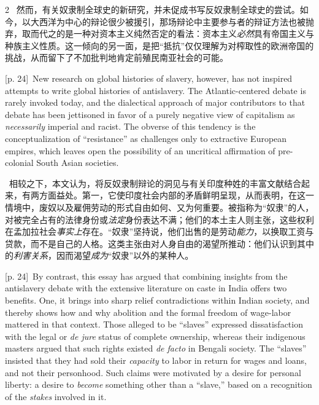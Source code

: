 \documentclass[10pt,a4paper]{article}
\begin{document}
\begin{paracol}{2}
\switchcolumn*
{\scriptsize\color{gray} [p. 24]}\ 然而，有关奴隶制全球史的新研究，并未促成书写反奴隶制全球史的尝试。如今，以大西洋为中心的辩论很少被援引，那场辩论中主要参与者的辩证方法也被抛弃，取而代之的是一种对资本主义纯然否定的看法：资本主义\textit{必然}具有帝国主义与种族主义性质。这一倾向的另一面，是把“抵抗”仅仅理解为对榨取性的欧洲帝国的挑战，从而留下了不加批判地肯定前殖民南亚社会的可能。\par
\switchcolumn
{\scriptsize\color{gray} [p. 24]}\ New research on global histories of slavery, however, has not inspired attempts to write global histories of antislavery. The Atlantic-centered debate is rarely invoked today, and the dialectical approach of major contributors to that debate has been jettisoned in favor of a purely negative view of capitalism as \textit{necessarily} imperial and racist. The obverse of this tendency is the conceptualization of “resistance” as challenges only to extractive European empires, which leaves open the possibility of an uncritical affirmation of pre-colonial South Asian societies.\par
\switchcolumn*
{\scriptsize\color{gray} [p. 24]}\ 相较之下，本文认为，将反奴隶制辩论的洞见与有关印度种姓的丰富文献结合起来，有两方面益处。第一，它使印度社会内部的矛盾鲜明呈现，从而表明，在这一情境中，废奴以及雇佣劳动的形式自由如何、又为何重要。被指称为“奴隶”的人，对被完全占有的法律身份或\textit{法定}身份表达不满；他们的本土主人则主张，这些权利在孟加拉社会\textit{事实上}存在。“奴隶”坚持说，他们出售的是劳动\textit{能力}，以换取工资与贷款，而不是自己的人格。这类主张由对人身自由的渴望所推动：他们认识到其中的\textit{利害关系}，因而渴望\textit{成为}“奴隶”以外的某种人。\par
\switchcolumn
{\scriptsize\color{gray} [p. 24]}\ By contrast, this essay has argued that combining insights from the antislavery debate with the extensive literature on caste in India offers two benefits. One, it brings into sharp relief contradictions within Indian society, and thereby shows how and why abolition and the formal freedom of wage-labor mattered in that context. Those alleged to be “slaves” expressed dissatisfaction with the legal or \textit{de jure} status of complete ownership, whereas their indigenous masters argued that such rights existed \textit{de facto} in Bengali society. The “slaves” insisted that they had sold their \textit{capacity} to labor in return for wages and loans, and not their personhood. Such claims were motivated by a desire for personal liberty: a desire to \textit{become} something other than a “slave,” based on a recognition of the \textit{stakes} involved in it.\par

\end{paracol}
\end{document}
